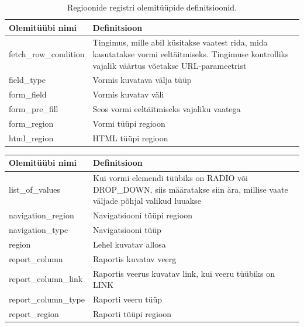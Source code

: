 \documentclass[a4paper,12pt]{article} %
\begin{document}
\begin{table}[H]
\centering
\caption{Regioonide registri olemitüüpide definitsioonid.}
\label{table_er_regioonide_registri_olemitüüpide_definitsioonid}
\begin{tabular}{|p{4cm}|p{11cm}|}
\hline
\rowcolor{rowgray}
Olemitüübi nimi & Definitsioon \\ \hline
fetch\_row\_condition & Tingimus, mille abil küsitakse vaatest rida, mida kasutatakse vormi eeltäitmiseks. Tingimuse kontrolliks vajalik väärtus võetakse URL-parameetrist \\ \hline
field\_type & Vormis kuvatava välja tüüp \\ \hline
form\_field & Vormis kuvatav väli \\ \hline
form\_pre\_fill & Seos vormi eeltäitmiseks vajaliku vaatega \\ \hline
form\_region & Vormi tüüpi regioon \\ \hline
html\_region & HTML tüüpi regioon \\ \hline

\end{tabular}
\end{table}
\begin{table}[H]
\centering
\begin{tabular}{|p{4cm}|p{11cm}|}
\hline
\rowcolor{rowgray}
Olemitüübi nimi & Definitsioon \\ \hline

list\_of\_values & Kui vormi elemendi tüübiks on RADIO või DROP\_DOWN, siis määratakse siin ära, millise vaate väljade põhjal valikud luuakse \\ \hline
navigation\_region & Navigatsiooni tüüpi regioon \\ \hline
navigation\_type & Navigatsiooni tüüp\\ \hline
region & Lehel kuvatav allosa \\ \hline
report\_column & Raportis kuvatav veerg \\ \hline
report\_column\_link & Raportis veerus kuvatav link, kui veeru tüübiks on LINK \\ \hline
report\_column\_type & Raporti veeru tüüp \\ \hline
report\_region & Raporti tüüpi regioon \\ \hline
\end{tabular}
\end{table}
\end{document}
